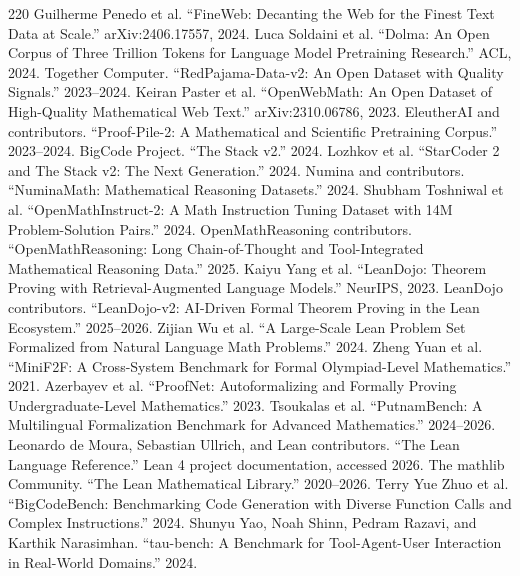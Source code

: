 \documentclass[11pt]{article}
\newcommand{\1}{\mathbf{1}}
\begin{document}
\begin{thebibliography}{220}
 Guilherme Penedo et al. ``FineWeb: Decanting the Web for the Finest Text Data at Scale.'' arXiv:2406.17557, 2024.
 Luca Soldaini et al. ``Dolma: An Open Corpus of Three Trillion Tokens for Language Model Pretraining Research.'' ACL, 2024.
 Together Computer. ``RedPajama-Data-v2: An Open Dataset with Quality Signals.'' 2023--2024.
 Keiran Paster et al. ``OpenWebMath: An Open Dataset of High-Quality Mathematical Web Text.'' arXiv:2310.06786, 2023.
 EleutherAI and contributors. ``Proof-Pile-2: A Mathematical and Scientific Pretraining Corpus.'' 2023--2024.
 BigCode Project. ``The Stack v2.'' 2024.
 Lozhkov et al. ``StarCoder 2 and The Stack v2: The Next Generation.'' 2024.
 Numina and contributors. ``NuminaMath: Mathematical Reasoning Datasets.'' 2024.
 Shubham Toshniwal et al. ``OpenMathInstruct-2: A Math Instruction Tuning Dataset with 14M Problem-Solution Pairs.'' 2024.
 OpenMathReasoning contributors. ``OpenMathReasoning: Long Chain-of-Thought and Tool-Integrated Mathematical Reasoning Data.'' 2025.
 Kaiyu Yang et al. ``LeanDojo: Theorem Proving with Retrieval-Augmented Language Models.'' NeurIPS, 2023.
 LeanDojo contributors. ``LeanDojo-v2: AI-Driven Formal Theorem Proving in the Lean Ecosystem.'' 2025--2026.
 Zijian Wu et al. ``A Large-Scale Lean Problem Set Formalized from Natural Language Math Problems.'' 2024.
 Zheng Yuan et al. ``MiniF2F: A Cross-System Benchmark for Formal Olympiad-Level Mathematics.'' 2021.
 Azerbayev et al. ``ProofNet: Autoformalizing and Formally Proving Undergraduate-Level Mathematics.'' 2023.
 Tsoukalas et al. ``PutnamBench: A Multilingual Formalization Benchmark for Advanced Mathematics.'' 2024--2026.
 Leonardo de Moura, Sebastian Ullrich, and Lean contributors. ``The Lean Language Reference.'' Lean 4 project documentation, accessed 2026.
 The mathlib Community. ``The Lean Mathematical Library.'' 2020--2026.
 Terry Yue Zhuo et al. ``BigCodeBench: Benchmarking Code Generation with Diverse Function Calls and Complex Instructions.'' 2024.
 Shunyu Yao, Noah Shinn, Pedram Razavi, and Karthik Narasimhan. ``tau-bench: A Benchmark for Tool-Agent-User Interaction in Real-World Domains.'' 2024.

\end{thebibliography}
\end{document}
